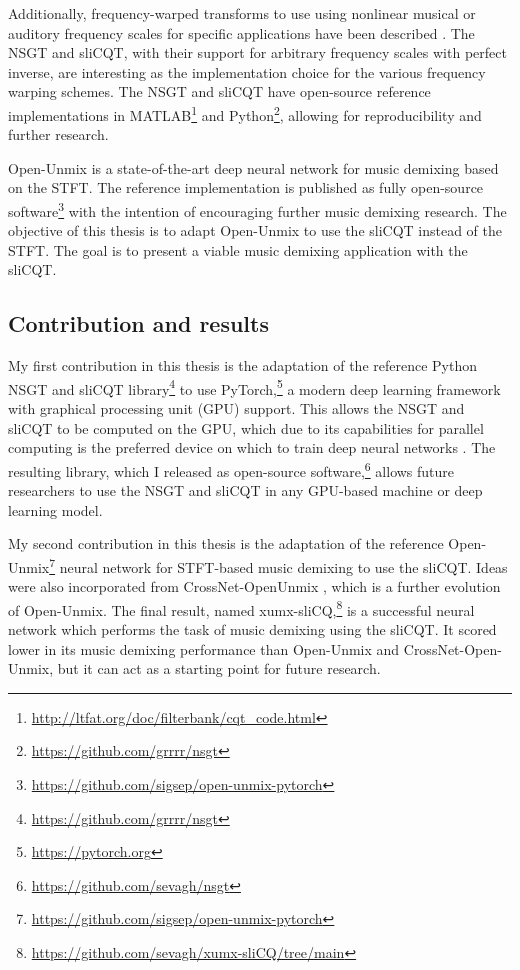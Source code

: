 \documentclass[report.tex]{subfiles}
\begin{document}
Additionally, frequency-warped transforms to use using nonlinear musical or auditory frequency scales for specific applications have been described \parencite{warped1, warped2, earlywarped1, earlywarped2, warpedcomparison, warpedpsycho}. The NSGT and sliCQT, with their support for arbitrary frequency scales with perfect inverse, are interesting as the implementation choice for the various frequency warping schemes. The NSGT and sliCQT have open-source reference implementations in MATLAB\footnote{\url{http://ltfat.org/doc/filterbank/cqt_code.html}} and Python\footnote{\url{https://github.com/grrrr/nsgt}}, allowing for reproducibility and further research.

Open-Unmix \parencite{umx} is a state-of-the-art deep neural network for music demixing based on the STFT. The reference implementation is published as fully open-source software\footnote{\url{https://github.com/sigsep/open-unmix-pytorch}} with the intention of encouraging further music demixing research. The objective of this thesis is to adapt Open-Unmix to use the sliCQT instead of the STFT. The goal is to present a viable music demixing application with the sliCQT.

\subsection{Contribution and results}

My first contribution in this thesis is the adaptation of the reference Python NSGT and sliCQT library\footnote{\url{https://github.com/grrrr/nsgt}} to use PyTorch,\footnote{\url{https://pytorch.org}} a modern deep learning framework with graphical processing unit (GPU) support. This allows the NSGT and sliCQT to be computed on the GPU, which due to its capabilities for parallel computing is the preferred device on which to train deep neural networks \parencite{pytorch}. The resulting library, which I released as open-source software,\footnote{\url{https://github.com/sevagh/nsgt}} allows future researchers to use the NSGT and sliCQT in any GPU-based machine or deep learning model.

My second contribution in this thesis is the adaptation of the reference Open-Unmix\footnote{\url{https://github.com/sigsep/open-unmix-pytorch}} neural network for STFT-based music demixing \parencite{umx} to use the sliCQT. Ideas were also incorporated from CrossNet-OpenUnmix \parencite{xumx}, which is a further evolution of Open-Unmix. The final result, named xumx-sliCQ,\footnote{\url{https://github.com/sevagh/xumx-sliCQ/tree/main}} is a successful neural network which performs the task of music demixing using the sliCQT. It scored lower in its music demixing performance than Open-Unmix and CrossNet-Open-Unmix, but it can act as a starting point for future research.
\end{document}
